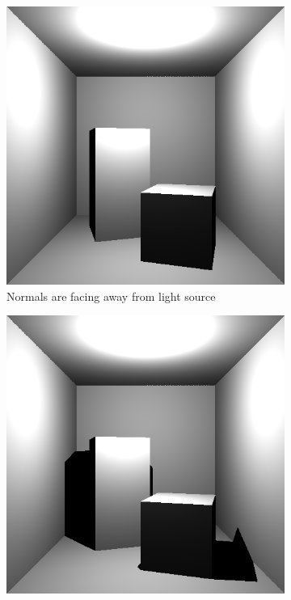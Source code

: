 \documentclass[a4paper,11pt]{article}
\begin{document}
\begin{figure}[h!]
	\centering
	\begin{subfigure}[h!]{0.3\linewidth}
		\centering
		\includegraphics[width=\linewidth]{screenshot2.png}
		\caption{Normals are facing away from light source}
		\label{fig2}
	\end{subfigure}
	\begin{subfigure}[h!]{0.3\linewidth}
		\centering
		\includegraphics[width=\linewidth]{screenshot25.png}

\end{subfigure}
\end{figure}
\end{document}

